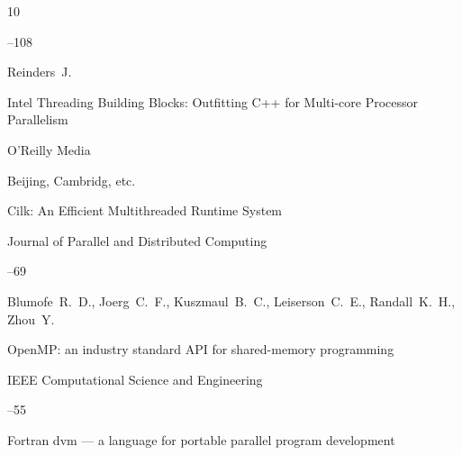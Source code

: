 \begin{thebibliography}{10}

--108








\by Reinders~J.

\book Intel Threading Building Blocks: Outfitting C++ for  Multi-core Processor Parallelism

\publ O'Reilly Media

\publaddr Beijing, Cambridg, etc.












\paper Cilk: An Efficient Multithreaded Runtime System


\jour Journal of Parallel and Distributed Computing 



--69

\by Blumofe~R.~D., Joerg~C.~F., Kuszmaul~B.~C., Leiserson~C.~E., Randall~K.~H., Zhou~Y. 






\paper OpenMP: an industry standard API for shared-memory programming


\jour IEEE Computational Science and Engineering 



--55








\paper Fortran dvm --- a language for portable parallel program development


\end{thebibliography}
